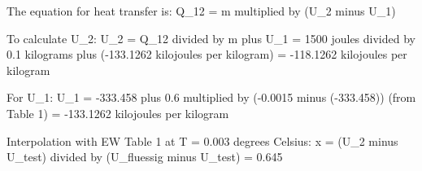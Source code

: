 The equation for heat transfer is:  
Q_12 = m multiplied by (U_2 minus U_1)  

To calculate U_2:  
U_2 = Q_12 divided by m plus U_1  
= 1500 joules divided by 0.1 kilograms plus (-133.1262 kilojoules per kilogram)  
= -118.1262 kilojoules per kilogram  

For U_1:  
U_1 = -333.458 plus 0.6 multiplied by (-0.0015 minus (-333.458)) (from Table 1)  
= -133.1262 kilojoules per kilogram  

Interpolation with EW Table 1 at T = 0.003 degrees Celsius:  
x = (U_2 minus U_test) divided by (U_fluessig minus U_test)  
= 0.645